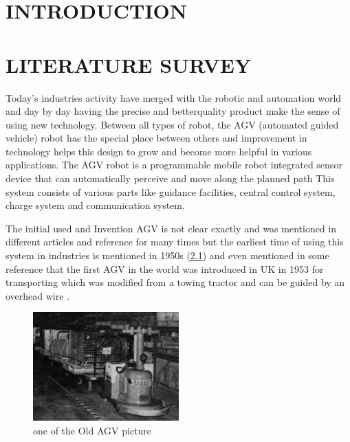 \documentclass[main]{subfiles}
\begin{document}
\centering
\tableofcontents
\newpage

\listoffigures
\newpage

\listoftables
\newpage
\justifying
\chapter{INTRODUCTION}

\newpage
\chapter{LITERATURE SURVEY}
Today’s industries activity have merged
with the robotic and automation world and
day by day having the precise and betterquality
product make the sense of using
new technology. Between all types of
robot, the AGV (automated guided
vehicle) robot has the special place
between others and improvement in
technology helps this design to grow and
become more helpful in various
applications. The AGV robot is a
programmable mobile robot integrated
sensor device that can automatically
perceive and move along the planned
path\cite{das2016design} This system consists of various
parts like guidance facilities, central
control system, charge system and
communication system\cite{moshayedi2019agv}. 

The initial used and Invention AGV is not clear exactly and
was mentioned in different articles and
reference for many times but the earliest
time of using this system in industries is
mentioned in 1950s \cite{reveliotis2000conflict}
(\cref{oldAgv}) and even
mentioned in some reference that the first
AGV in the world was introduced in UK in
1953 for transporting which was modified
from a towing tractor and can be guided by
an overhead wire \cite{moshayedi2019agv}.

\begin{figure}[H]
    \centering
\includegraphics[width=0.5\textwidth]{doc/oldestAGV.jpg}
\caption{one of the Old AGV picture}
\label{oldAgv} %
\end{figure}
\end{document}
